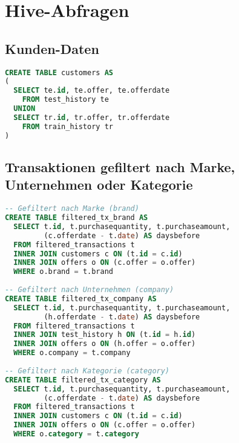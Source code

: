 \section{Hive-Abfragen}

\subsection{Kunden-Daten}
\begin{lstlisting}[language=SQL]
CREATE TABLE customers AS 
(
  SELECT te.id, te.offer, te.offerdate
    FROM test_history te
  UNION
  SELECT tr.id, tr.offer, tr.offerdate
    FROM train_history tr 
)
\end{lstlisting}

\subsection{Transaktionen gefiltert nach Marke, Unternehmen oder Kategorie}
\label{sql:filtered_tx}
\begin{lstlisting}[language=SQL]
-- Gefiltert nach Marke (brand)
CREATE TABLE filtered_tx_brand AS
  SELECT t.id, t.purchasequantity, t.purchaseamount, 
         (c.offerdate - t.date) AS daysbefore 
  FROM filtered_transactions t 
  INNER JOIN customers c ON (t.id = c.id)
  INNER JOIN offers o ON (c.offer = o.offer)
  WHERE o.brand = t.brand
  
-- Gefiltert nach Unternehmen (company)
CREATE TABLE filtered_tx_company AS
  SELECT t.id, t.purchasequantity, t.purchaseamount, 
         (h.offerdate - t.date) AS daysbefore 
  FROM filtered_transactions t 
  INNER JOIN test_history h ON (t.id = h.id)
  INNER JOIN offers o ON (h.offer = o.offer)
  WHERE o.company = t.company
  
-- Gefiltert nach Kategorie (category)
CREATE TABLE filtered_tx_category AS
  SELECT t.id, t.purchasequantity, t.purchaseamount, 
         (c.offerdate - t.date) AS daysbefore 
  FROM filtered_transactions t 
  INNER JOIN customers c ON (t.id = c.id)
  INNER JOIN offers o ON (c.offer = o.offer)
  WHERE o.category = t.category
\end{lstlisting}

